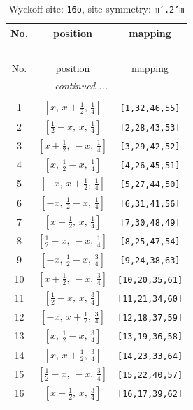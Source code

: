 \documentclass[fleqn,8pt]{jsarticle}
\begin{document}
\renewcommand{\arraystretch}{1.2}
\begin{longtable}{ccc}
\caption{Wyckoff site: {\tt 16o}, site symmetry: {\tt m'.2'm}}
 \\
 \hline \hline
No. & position & mapping \\ \hline \endfirsthead

\multicolumn{2}{l}{\tablename\ \thetable{}} \\
 \hline \hline
No. & position & mapping \\ \hline \endhead

 \hline \hline
\multicolumn{2}{r}{\footnotesize\it continued ...} \\ \endfoot

 \hline \hline
\multicolumn{2}{r}{} \\ \endlastfoot

1 & $\left[ x,\, x + \frac{1}{2},\, \frac{1}{4} \right]$ & {\tt [1,32,46,55]} \\ \hline
2 & $\left[ \frac{1}{2} - x,\, x,\, \frac{1}{4} \right]$ & {\tt [2,28,43,53]} \\ \hline
3 & $\left[ x + \frac{1}{2},\, - x,\, \frac{1}{4} \right]$ & {\tt [3,29,42,52]} \\ \hline
4 & $\left[ x,\, \frac{1}{2} - x,\, \frac{1}{4} \right]$ & {\tt [4,26,45,51]} \\ \hline
5 & $\left[ - x,\, x + \frac{1}{2},\, \frac{1}{4} \right]$ & {\tt [5,27,44,50]} \\ \hline
6 & $\left[ - x,\, \frac{1}{2} - x,\, \frac{1}{4} \right]$ & {\tt [6,31,41,56]} \\ \hline
7 & $\left[ x + \frac{1}{2},\, x,\, \frac{1}{4} \right]$ & {\tt [7,30,48,49]} \\ \hline
8 & $\left[ \frac{1}{2} - x,\, - x,\, \frac{1}{4} \right]$ & {\tt [8,25,47,54]} \\ \hline
9 & $\left[ - x,\, \frac{1}{2} - x,\, \frac{3}{4} \right]$ & {\tt [9,24,38,63]} \\ \hline
10 & $\left[ x + \frac{1}{2},\, - x,\, \frac{3}{4} \right]$ & {\tt [10,20,35,61]} \\ \hline
11 & $\left[ \frac{1}{2} - x,\, x,\, \frac{3}{4} \right]$ & {\tt [11,21,34,60]} \\ \hline
12 & $\left[ - x,\, x + \frac{1}{2},\, \frac{3}{4} \right]$ & {\tt [12,18,37,59]} \\ \hline
13 & $\left[ x,\, \frac{1}{2} - x,\, \frac{3}{4} \right]$ & {\tt [13,19,36,58]} \\ \hline
14 & $\left[ x,\, x + \frac{1}{2},\, \frac{3}{4} \right]$ & {\tt [14,23,33,64]} \\ \hline
15 & $\left[ \frac{1}{2} - x,\, - x,\, \frac{3}{4} \right]$ & {\tt [15,22,40,57]} \\ \hline
16 & $\left[ x + \frac{1}{2},\, x,\, \frac{3}{4} \right]$ & {\tt [16,17,39,62]} \\
\end{longtable}
\end{document}
